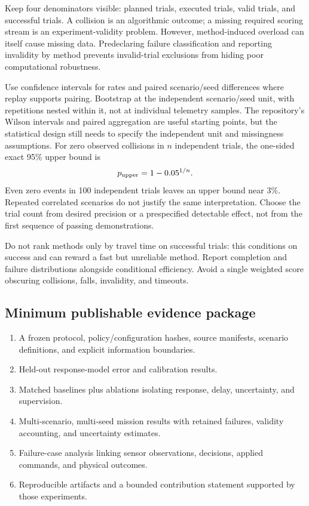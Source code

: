 \documentclass[11pt,a4paper]{article}
\begin{document}
Keep four denominators visible: planned trials, executed trials, valid
trials, and successful trials. A collision is an algorithmic outcome; a
missing required scoring stream is an experiment-validity problem. However,
method-induced overload can itself cause missing data. Predeclaring failure
classification and reporting invalidity by method prevents invalid-trial
exclusions from hiding poor computational robustness.

Use confidence intervals for rates and paired scenario/seed differences
where replay supports pairing. Bootstrap at the independent scenario/seed
unit, with repetitions nested within it, not at individual telemetry samples.
The repository's Wilson intervals and paired aggregation are useful
starting points, but the statistical design still needs to specify the
independent unit and missingness assumptions. For zero observed collisions
in $n$ independent trials, the one-sided exact 95\% upper bound is
\begin{equation}
p_{\rm upper}=1-0.05^{1/n}.
\end{equation}
Even zero events in 100 independent trials leaves an upper bound near 3\%.
Repeated correlated scenarios do not justify the same interpretation.
Choose the trial count from desired precision or a prespecified detectable
effect, not from the first sequence of passing demonstrations.

Do not rank methods only by travel time on successful trials: this conditions
on success and can reward a fast but unreliable method. Report completion
and failure distributions alongside conditional efficiency. Avoid a single
weighted score obscuring collisions, falls, invalidity, and timeouts.

\subsection{Minimum publishable evidence package}
\begin{enumerate}
\item A frozen protocol, policy/configuration hashes, source manifests,
scenario definitions, and explicit information boundaries.
\item Held-out response-model error and calibration results.
\item Matched baselines plus ablations isolating response, delay,
uncertainty, and supervision.
\item Multi-scenario, multi-seed mission results with retained failures,
validity accounting, and uncertainty estimates.
\item Failure-case analysis linking sensor observations, decisions, applied
commands, and physical outcomes.
\item Reproducible artifacts and a bounded contribution statement supported
by those experiments.
\end{enumerate}
\end{document}

